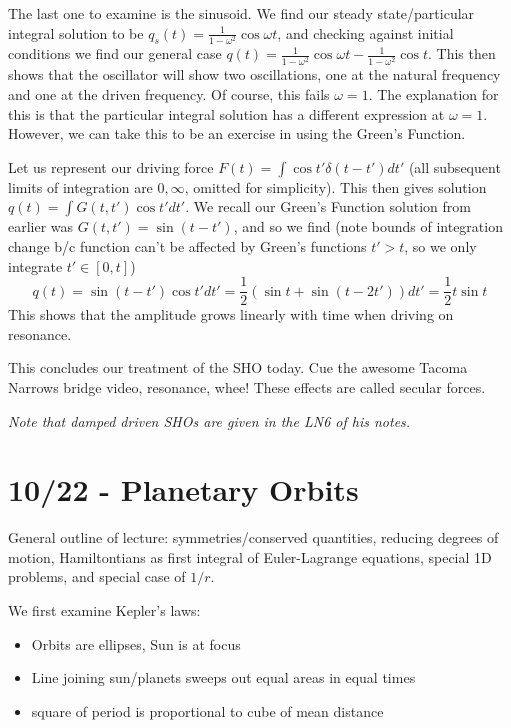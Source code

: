 \documentclass[10pt]{report}
\begin{document}
The last one to examine is the sinusoid. We find our steady state/particular integral solution to be $q_s(t) = \frac{1}{1-\omega^2}\cos \omega t$, and checking against initial conditions we find our general case $q(t) = \frac{1}{1-\omega^2}\cos \omega t - \frac{1}{1-\omega^2}\cos t$. This then shows that the oscillator will show two oscillations, one at the natural frequency and one at the driven frequency. Of course, this fails $\omega = 1$. The explanation for this is that the particular integral solution has a different expression at $\omega = 1$. However, we can take this to be an exercise in using the Green's Function.

Let us represent our driving force $F(t) = \int \cos t' \delta(t-t') dt'$ (all subsequent limits of integration are $0,\infty$, omitted for simplicity). This then gives solution $q(t) = \int G(t,t') \cos t' dt'$. We recall our Green's Function solution from earlier was $G(t,t') = \sin (t-t')$, and so we find (note bounds of integration change b/c function can't be affected by Green's functions $t' > t$, so we only integrate $t' \in [0,t]$)
$$q(t) = \sin(t-t')\cos t' dt' = \frac{1}{2} \left( \sin t + \sin (t-2t') \right) dt' = \frac{1}{2} t \sin t$$
This shows that the amplitude grows linearly with time when driving on resonance.

This concludes our treatment of the SHO today. Cue the awesome Tacoma Narrows bridge video, resonance, whee! These effects are called secular forces. 

\emph{Note that damped driven SHOs are given in the LN6 of his notes.}

\chapter{10/22 - Planetary Orbits}

General outline of lecture: symmetries/conserved quantities, reducing degrees of motion, Hamiltontians as first integral of Euler-Lagrange equations, special 1D problems, and special case of $1/r$.

We first examine Kepler's laws:
\begin{itemize}
    \item Orbits are ellipses, Sun is at focus
    \item Line joining sun/planets sweeps out equal areas in equal times
    \item square of period is proportional to cube of mean distance
\end{itemize}
\end{document}
